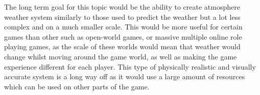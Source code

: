 The long term goal for this topic would be the ability to create atmosphere weather system similarly to those used to predict the weather but a lot less complex and on a much smaller scale.
This would be more useful for certain games than other such as open-world games, or massive multiple online role playing games, as the scale of these worlds would mean that weather would change whilst moving around the game world, as well as making the game experience different for each player.
This type of physically realistic and visually accurate system is a long way off as it would use a large amount of resources which can be used on other parts of the game.